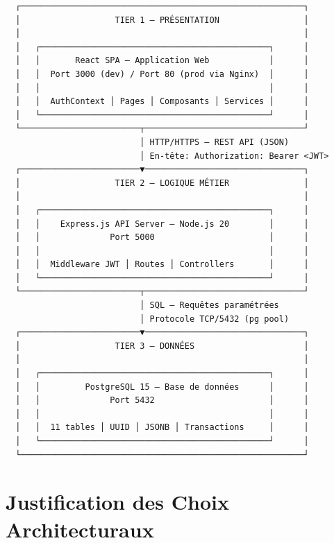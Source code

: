 \documentclass[12pt,a4paper]{report}
\begin{document}
\begin{center}
\begin{verbatim}
  ┌─────────────────────────────────────────────────────────┐
  │                   TIER 1 — PRÉSENTATION                 │
  │                                                         │
  │   ┌──────────────────────────────────────────────┐      │
  │   │       React SPA — Application Web            │      │
  │   │  Port 3000 (dev) / Port 80 (prod via Nginx)  │      │
  │   │                                              │      │
  │   │  AuthContext │ Pages │ Composants │ Services │      │
  │   └──────────────────────────────────────────────┘      │
  └────────────────────────┬────────────────────────────────┘
                           │ HTTP/HTTPS — REST API (JSON)
                           │ En-tête: Authorization: Bearer <JWT>
  ┌────────────────────────▼────────────────────────────────┐
  │                   TIER 2 — LOGIQUE MÉTIER               │
  │                                                         │
  │   ┌──────────────────────────────────────────────┐      │
  │   │    Express.js API Server — Node.js 20        │      │
  │   │              Port 5000                       │      │
  │   │                                              │      │
  │   │  Middleware JWT │ Routes │ Controllers       │      │
  │   └──────────────────────────────────────────────┘      │
  └────────────────────────┬────────────────────────────────┘
                           │ SQL — Requêtes paramétrées
                           │ Protocole TCP/5432 (pg pool)
  ┌────────────────────────▼────────────────────────────────┐
  │                   TIER 3 — DONNÉES                      │
  │                                                         │
  │   ┌──────────────────────────────────────────────┐      │
  │   │         PostgreSQL 15 — Base de données      │      │
  │   │              Port 5432                       │      │
  │   │                                              │      │
  │   │  11 tables │ UUID │ JSONB │ Transactions     │      │
  │   └──────────────────────────────────────────────┘      │
  └─────────────────────────────────────────────────────────┘
\end{verbatim}
\end{center}

\section{Justification des Choix Architecturaux}
\end{document}

